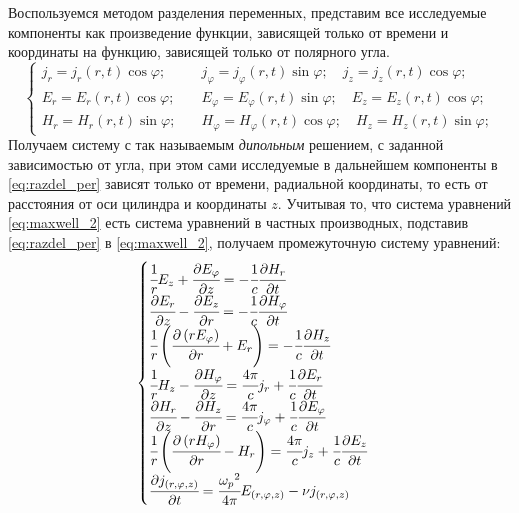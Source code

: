 \documentclass[a4paper]{article}
\begin{document}
Воспользуемся методом разделения переменных, представим все исследуемые компоненты как произведение функции, зависящей только от времени и координаты на функцию, зависящей только от полярного угла.
\begin{equation}
	\begin{cases}
		j_{r}=j_{r}(r,t)\cos\varphi; &\quad j_{\varphi}=j_{\varphi}(r,t)\sin\varphi;\quad j_{z}=j_{z}(r,t)\cos\varphi;\\
		E_{r}=E_{r}(r,t)\cos\varphi; &\quad E_{\varphi}=E_{\varphi}(r,t)\sin\varphi;\quad E_{z}=E_{z}(r,t)\cos\varphi;\\
		H_{r}=H_{r}(r,t)\sin\varphi; &\quad H_{\varphi}=H_{\varphi}(r,t)\cos\varphi;\quad H_{z}=H_{z}(r,t)\sin\varphi;
	\end{cases}	
\label{eq:razdel_per}
\end{equation} 
\newpage
Получаем систему с так называемым \textit{дипольным} решением, с заданной зависимостью от угла, при этом сами исследуемые в дальнейшем компоненты в \eqref{eq:razdel_per} зависят только от времени, радиальной координаты, то есть от расстояния от оси цилиндра и координаты $z$. Учитывая то, что система уравнений \eqref{eq:maxwell_2} есть система уравнений в частных производных, подставив \eqref{eq:razdel_per} в \eqref{eq:maxwell_2}, получаем промежуточную систему уравнений:
\begin{equation}
	\begin{cases}		
		\cfrac{1}{r}E_{z}+\cfrac{\partial E_{\varphi}}{\partial z}=-\cfrac{1}{c}\cfrac{\partial H_{r}}{\partial t}\\
		\cfrac{\partial E_{r}}{\partial z}-\cfrac{\partial E_{z}}{\partial r}=-\cfrac{1}{c}\cfrac{\partial H_{\varphi}}{\partial t}\\
		\cfrac{1}{r}\left(\cfrac{\partial\left(rE_{\varphi}\right)}{\partial r}+E_{r}\right)=-\cfrac{1}{c}\cfrac{\partial H_{z}}{\partial t}\\
		\cfrac{1}{r}H_{z}-\cfrac{\partial H_{\varphi}}{\partial z}=\cfrac{4\pi}{c}j_{r}+\cfrac{1}{c}\cfrac{\partial E_{r}}{\partial t}\\
		\cfrac{\partial H_{r}}{\partial z}-\cfrac{\partial H_{z}}{\partial r}=\cfrac{4\pi}{c}j_{\varphi}+\cfrac{1}{c}\cfrac{\partial E_{\varphi}}{\partial t}\\
		\cfrac{1}{r}\left(\cfrac{\partial\left(rH_{\varphi}\right)}{\partial r}-H_{r}\right)=\cfrac{4\pi}{c}j_{z}+\cfrac{1}{c}\cfrac{\partial E_{z}}{\partial t}\\
		\cfrac{\partial{j_{(r,\varphi,z)}}}{\partial t}=\cfrac{{\omega_{p}}^{2}}{4\pi}{E_{(r,\varphi,z)}}-\nu{j_{(r,\varphi,z)}}
	\end{cases}
	\label{eq:maxwell_last}
\end{equation}
\end{document}
